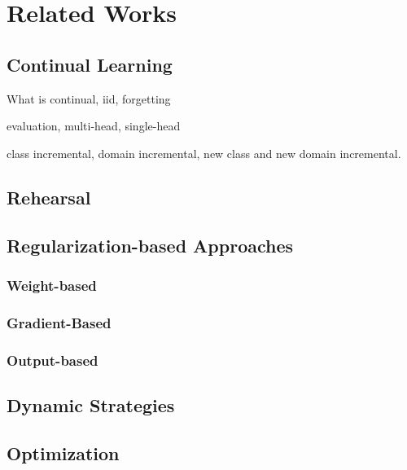 \chapter{Related Works}
\label{chapter:related}

{}


\section{Continual Learning}

What is continual, iid, forgetting

evaluation, multi-head, single-head

class incremental, domain incremental, new class and new domain incremental. \cite{lomonaco2017core50}

\section{Rehearsal}

\section{Regularization-based Approaches}

\subsection{Weight-based}

\subsection{Gradient-Based}

\subsection{Output-based}

\section{Dynamic Strategies}



\section{Optimization}

